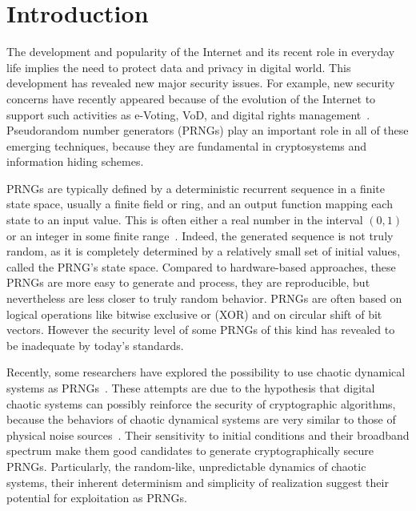 \chapter{Introduction}
\label{Introduction}
\minitoc

The development and popularity of the Internet and its recent role in everyday life implies the need to protect data and privacy in digital world. This development has revealed new major security issues. For example, new security concerns have recently appeared because of the evolution of the Internet to support such activities as e-Voting, VoD, and digital rights management~\cite{Zhu200675}. Pseudorandom number generators (PRNGs) play an important role in all of these emerging techniques, because they are fundamental in cryptosystems and information hiding schemes. 

PRNGs are typically defined by a deterministic recurrent sequence in a finite state space, usually a finite field or ring, and an output function mapping each state to an input value. 
This is often either a real number in the interval $(0,1)$ or an integer in some finite range~\cite{LEcuyer08}. 
Indeed, the generated sequence is not truly random, as it is completely determined by a relatively small set of initial values, called the PRNG's state space. 
Compared to hardware-based approaches, these PRNGs are more easy to generate and process, they are reproducible, but nevertheless are less closer to truly random behavior. 
PRNGs are often based on logical operations like bitwise exclusive or (XOR) and on circular shift of bit vectors. 
However the security level of some PRNGs of this kind has revealed to be inadequate by today's standards. 

Recently, some researchers have explored the possibility to use chaotic dynamical systems as PRNGs~\cite{Falcioni2005,Cecen2009,PO2004}. 
These attempts are due to the hypothesis that digital chaotic systems can possibly reinforce the security of cryptographic algorithms, because the behaviors of chaotic dynamical systems are very similar to those of physical noise sources~\cite{Schuster1984}. 
Their sensitivity to initial conditions and their broadband spectrum make them good candidates to generate cryptographically secure PRNGs. Particularly,  
the random-like, unpredictable dynamics of chaotic systems, their inherent determinism and simplicity of realization suggest their potential for exploitation as PRNGs.

